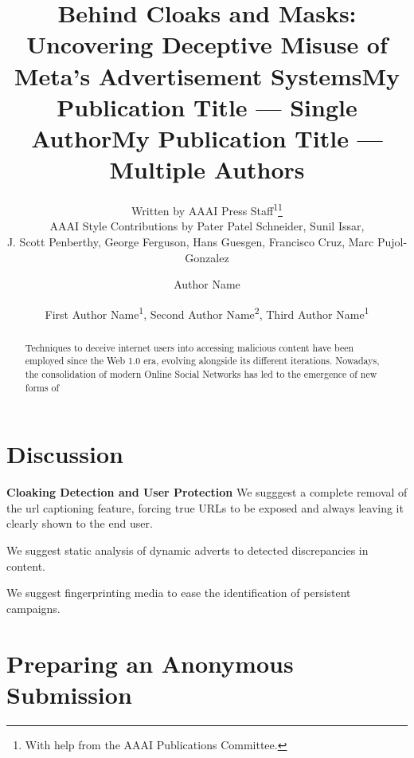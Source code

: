 \documentclass[letterpaper]{article} %
\title{Behind Cloaks and Masks: Uncovering Deceptive Misuse of Meta's Advertisement Systems}
\author{
    Written by AAAI Press Staff\textsuperscript{\rm 1}\thanks{With help from the AAAI Publications Committee.}\\
    AAAI Style Contributions by Pater Patel Schneider,
    Sunil Issar,\\
    J. Scott Penberthy,
    George Ferguson,
    Hans Guesgen,
    Francisco Cruz\equalcontrib,
    Marc Pujol-Gonzalez\equalcontrib
}
\title{My Publication Title --- Single Author}
\author {
    Author Name
}
\title{My Publication Title --- Multiple Authors}
\author {
    First Author Name\textsuperscript{\rm 1},
    Second Author Name\textsuperscript{\rm 2},
    Third Author Name\textsuperscript{\rm 1}
}
\begin{document}
\maketitle

\begin{abstract}
Techniques to deceive internet users into accessing malicious content have been employed since the Web 1.0 era, evolving alongside its different iterations. Nowadays, the consolidation of modern Online Social Networks has led to the emergence of new forms of  
\end{abstract}






\section{Discussion}
\textbf{Cloaking Detection and User Protection}
We sugggest a complete removal of the url captioning feature, forcing true URLs to be exposed and always leaving it clearly shown to the end user.

We suggest static analysis of dynamic adverts to detected discrepancies in content.

We suggest fingerprinting media to ease the identification of persistent campaigns.  

\section{Preparing an Anonymous Submission}




\end{document}
